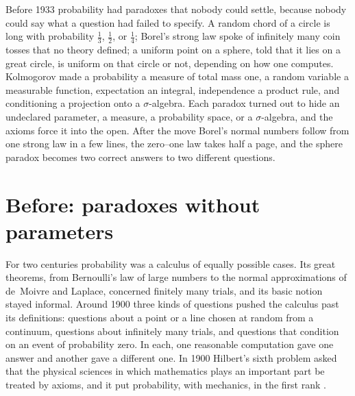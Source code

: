 \begin{refsection}
\newcommand{\kolP}{\mathbb{P}}
\newcommand{\kolsymdiff}{\mathbin{\triangle}}

\begin{chaptersummary}
Before 1933 probability had paradoxes that nobody could settle, because nobody could say what a question had failed to specify. A random chord of a circle is long with probability $\frac13$, $\frac12$, or $\frac14$; Borel's strong law spoke of infinitely many coin tosses that no theory defined; a uniform point on a sphere, told that it lies on a great circle, is uniform on that circle or not, depending on how one computes. Kolmogorov made a probability a measure of total mass one, a random variable a measurable function, expectation an integral, independence a product rule, and conditioning a projection onto a $\sigma$-algebra. Each paradox turned out to hide an undeclared parameter, a measure, a probability space, or a $\sigma$-algebra, and the axioms force it into the open. After the move Borel's normal numbers follow from one strong law in a few lines, the zero--one law takes half a page, and the sphere paradox becomes two correct answers to two different questions.
\end{chaptersummary}

\section{Before: paradoxes without parameters}\label{sec:kolmogorov:before}

For two centuries probability was a calculus of equally possible cases. Its great theorems, from Bernoulli's law of large numbers to the normal approximations of de~Moivre and Laplace, concerned finitely many trials, and its basic notion stayed informal. Around 1900 three kinds of questions pushed the calculus past its definitions: questions about a point or a line chosen at random from a continuum, questions about infinitely many trials, and questions that condition on an event of probability zero. In each, one reasonable computation gave one answer and another gave a different one. In 1900 Hilbert's sixth problem asked that the physical sciences in which mathematics plays an important part be treated by axioms, and it put probability, with mechanics, in the first rank \parencite{Hilbert1902}.


\end{refsection}
